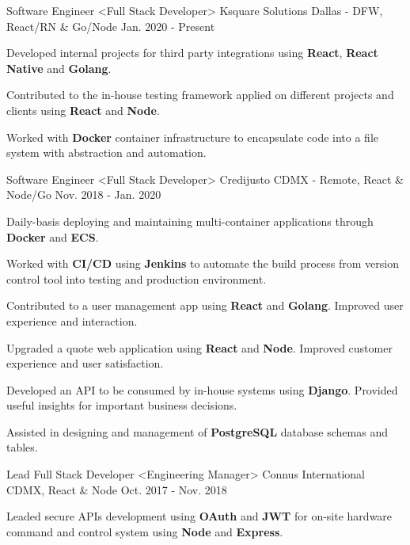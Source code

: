\begin{cventries}
  \cventry
    {Software Engineer <Full Stack Developer>}
    {Ksquare Solutions}
    {Dallas - DFW, React/RN \& Go/Node}
    {Jan. 2020 - Present}
    {
      \begin{cvitems}
        \item {Developed internal projects for third party integrations using \textbf{React}, \textbf{React Native} and \textbf{Golang}.}
        \item {Contributed to the in-house testing framework applied on different projects and clients using \textbf{React} and \textbf{Node}.}
        \item {Worked with \textbf{Docker} container infrastructure to encapsulate code into a file system with abstraction and automation.}
      \end{cvitems}
    }
  \cventry
    {Software Engineer <Full Stack Developer>}
    {Credijusto}
    {CDMX - Remote, React \& Node/Go}
    {Nov. 2018 - Jan. 2020}
    {
      \begin{cvitems}
        \item {Daily-basis deploying and maintaining multi-container applications through \textbf{Docker} and \textbf{ECS}.}
        \item {Worked with \textbf{CI/CD} using \textbf{Jenkins} to automate the build process from version control tool into testing and production environment.}
        \item {Contributed to a user management app using \textbf{React} and \textbf{Golang}. Improved user experience and interaction.}
        \item {Upgraded a quote web application using \textbf{React} and \textbf{Node}. Improved customer experience and user satisfaction.}
        \item {Developed an API to be consumed by in-house systems using \textbf{Django}. Provided useful insights for important business decisions.}
        \item {Assisted in designing and management of \textbf{PostgreSQL} database schemas and tables.}
      \end{cvitems}
    }
  \cventry
    {Lead Full Stack Developer <Engineering Manager>}
    {Connus International}
    {CDMX, React \& Node}
    {Oct. 2017 - Nov. 2018}
    {
      \begin{cvitems}
        \item {Leaded secure APIs development using \textbf{OAuth} and \textbf{JWT} for on-site hardware command and control system using \textbf{Node} and \textbf{Express}.}

\end{cvitems}}
\end{cventries}
